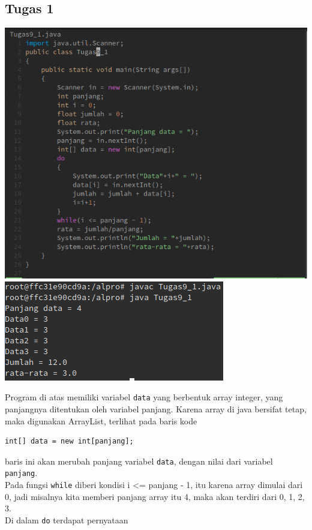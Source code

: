 \documentclass[a4paper,12pt]{article}
\begin{document}
\subsection{Tugas 1}
\begin{center}
	\includegraphics[scale=.5]{tugas1}
	\includegraphics[scale=.5]{tugas1_2}
\end{center}
Program di atas memiliki variabel \texttt{data} yang berbentuk array integer, yang panjangnya ditentukan oleh variabel panjang. Karena array di java bersifat tetap, maka digunakan ArrayList, terlihat pada baris kode
\begin{lstlisting}
int[] data = new int[panjang];
\end{lstlisting}   
baris ini akan merubah panjang variabel \texttt{data}, dengan nilai dari variabel \texttt{panjang}.\\
Pada fungsi \texttt{while} diberi kondisi i <= panjang - 1, itu karena array dimulai dari 0, jadi misalnya kita memberi panjang array itu 4, maka akan terdiri dari 0, 1, 2, 3.\\
Di dalam \texttt{do} terdapat pernyataan
\end{document}
